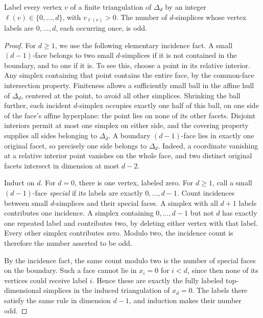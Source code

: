 \begin{lemma}\label{lemma:sperner}
Label every vertex \(v\) of a finite triangulation of \(\Delta_d\)
by an integer \(\ell(v)\in\{0,\ldots,d\}\), with
\(v_{\ell(v)}>0\). The number of \(d\)-simplices whose vertex
labels are \(0,\ldots,d\), each occurring once, is odd.
\end{lemma}
\begin{proof}
For \(d\ge1\), we use the following elementary incidence fact.
A small \((d-1)\)-face belongs to two small \(d\)-simplices if
it is not contained in the boundary, and to one if it is.
To see this, choose a point in its relative interior. Any simplex containing that point
contains the entire face, by the common-face intersection property.
Finiteness allows a sufficiently small ball in the affine hull of
\(\Delta_d\), centered at the point, to avoid all other simplices.
Shrinking the ball further, each incident \(d\)-simplex occupies
exactly one half of this ball, on one side of the face's affine
hyperplane: the point lies on none of its other facets. Disjoint
interiors permit at most one simplex on either side, and the covering
property supplies all sides belonging to \(\Delta_d\). A boundary
\((d-1)\)-face lies in exactly one original facet, so precisely one
side belongs to \(\Delta_d\). Indeed, a coordinate vanishing at a
relative interior point vanishes on the whole face, and two distinct
original facets intersect in dimension at most \(d-2\).

Induct on \(d\). For \(d=0\), there is one vertex, labeled zero.
For \(d\ge1\), call a small \((d-1)\)-face \emph{special} if
its labels are exactly \(0,\ldots,d-1\). Count incidences between
small \(d\)-simplices and their special faces. A simplex with all
\(d+1\) labels contributes one incidence. A simplex containing
\(0,\ldots,d-1\) but not \(d\) has exactly one repeated label
and contributes two, by deleting either vertex with that label.
Every other simplex contributes zero. Modulo two, the incidence
count is therefore the number asserted to be odd.

By the incidence fact, the same count modulo two is the number of
special faces on the boundary. Such a face cannot lie in
\(x_i=0\) for \(i<d\), since then none of its vertices could
receive label \(i\). Hence these are exactly the fully labeled
top-dimensional simplices in the induced triangulation of
\(x_d=0\). The labels there satisfy the same rule in dimension
\(d-1\), and induction makes their number odd.
\end{proof}

